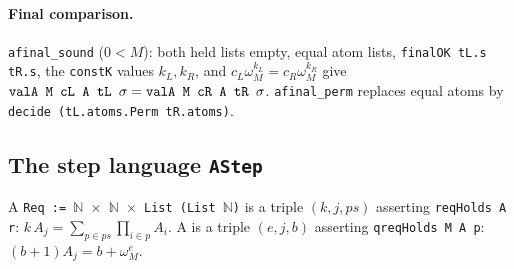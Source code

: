 \paragraph{Final comparison.} \textnormal{\texttt{afinal\_\allowbreak{}sound}} ($0<M$): both held lists empty, equal atom lists,
\textnormal{\texttt{finalOK tL.\allowbreak{}s tR.\allowbreak{}s}}, the \textnormal{\texttt{constK}} values $k_L,k_R$, and
$c_L\omega_M^{k_L} = c_R\omega_M^{k_R}$ give $\textnormal{\texttt{valA M cL A tL \ensuremath{\sigma}}} = \textnormal{\texttt{valA M cR A tR \ensuremath{\sigma}}}$.
\textnormal{\texttt{afinal\_\allowbreak{}perm}} replaces equal atoms by \textnormal{\texttt{decide (\allowbreak{}tL.\allowbreak{}atoms.\allowbreak{}Perm tR.\allowbreak{}atoms)}}.

\subsection{The step language \texorpdfstring{\textnormal{\texttt{AStep}}}{AStep}}

\begin{definition}\label{def:lean-pathsum-req}
A  \textnormal{\texttt{Req := \ensuremath{\mathbb{N}} \ensuremath{\times} \ensuremath{\mathbb{N}} \ensuremath{\times} List (\allowbreak{}List \ensuremath{\mathbb{N}})}} is a triple $(k,j,ps)$
asserting \textnormal{\texttt{reqHolds A r}}: $k\,A_j = \sum_{p\in ps}\prod_{i\in p}A_i$. A
 is a triple $(e,j,b)$ asserting \textnormal{\texttt{qreqHolds M A p}}:
$(b+1)A_j = b+\omega_M^e$.
\end{definition}

